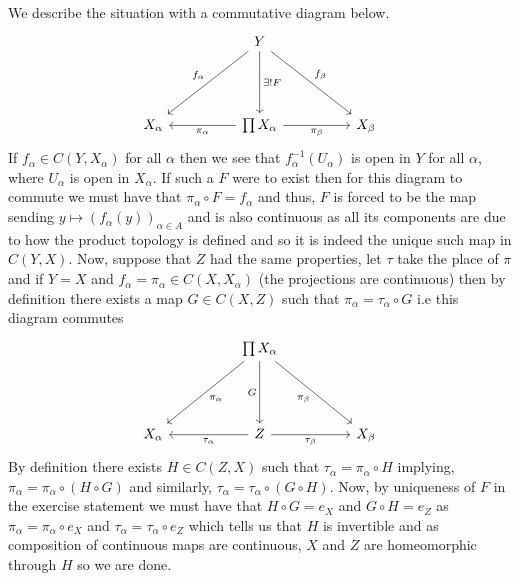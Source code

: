 \documentclass[12pt,a4paper]{article}
\begin{document}
\begin{solution}
We describe the situation with a commutative diagram below. 
\[\begin{tikzcd}[row sep=2.25em]
	&& Y && \\
	\\
	{X_\alpha} && {\prod X_\alpha} && {X_\beta}
	\arrow["{f_\alpha}"', from=1-3, to=3-1]
	\arrow["{\exists !F}", from=1-3, to=3-3]
	\arrow["{f_\beta}", from=1-3, to=3-5]
	\arrow["{\pi_\alpha}", from=3-3, to=3-1]
	\arrow["{\pi_\beta}"', from=3-3, to=3-5]
\end{tikzcd}\]
If $f_\alpha\in C(Y,X_\alpha)$ for all $\alpha$ then we see that $f_\alpha^{-1}(U_\alpha)$ is open in $Y$ for all $\alpha$, where $U_\alpha$ is open in $X_\alpha$. 
If such a $F$ were to exist then for this diagram to commute we must have that $\pi_\alpha\circ F=f_\alpha$ and thus, $F$ is forced to be the map sending $y\mapsto (f_\alpha(y))_{\alpha\in A}$ and is also continuous as all its components are due to how the product topology is defined and so it is indeed the unique such map in $C(Y,X).$ 
Now, suppose that $Z$ had the same properties, let $\tau$ take the place of $\pi$ and if $Y=X$ and $f_\alpha=\pi_\alpha\in C(X,X_\alpha)$ (the projections are continuous) then by definition there exists a map $G\in C(X,Z)$ such that $\pi_\alpha=\tau_\alpha\circ G$ i.e this diagram commutes
\[\begin{tikzcd}[row sep=2.25em]
	&& {\prod X_\alpha} && \\
	\\
	{X_\alpha} && Z && {X_\beta}
	\arrow["{\pi_\alpha}", from=1-3, to=3-1]
	\arrow["G"', from=1-3, to=3-3]
	\arrow["{\pi_\beta}"', from=1-3, to=3-5]
	\arrow["{\tau_\alpha}", from=3-3, to=3-1]
	\arrow["{\tau_\beta}"', from=3-3, to=3-5]
\end{tikzcd}\]
By definition there exists $H\in C(Z,X)$ such that $\tau_\alpha=\pi_\alpha\circ H$ implying, $\pi_\alpha=\pi_\alpha\circ(H\circ G)$ and similarly, $\tau_\alpha=\tau_\alpha\circ(G\circ H)$. 
Now, by uniqueness of $F$ in the exercise statement we must have that $H\circ G=e_X$ and $G\circ H=e_Z$ as $\pi_\alpha=\pi_\alpha\circ e_X$ and $\tau_\alpha=\tau_\alpha\circ e_Z$ which tells us that $H$ is invertible and as composition of continuous maps are continuous, $X$ and $Z$ are homeomorphic through $H$ so we are done. 
\end{solution}
\end{document}
